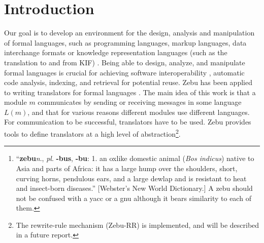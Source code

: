 \vspace*{0.5 in}



\begin{abstract}
{\sf Zebu}\footnote{``{\bf zebu}{\em n}., {\em pl}. {\bf -bus}, {\bf
-bu}: 1. an oxlike domestic animal ({\em Bos indicus}) native to Asia
and parts of Africa: it has a large hump over the shoulders, short,
curving horns, pendulous ears, and a large dewlap and is resistant to
heat and insect-born diseases.''  [Webster's New World Dictionary.]
A zebu should not be confused with a yacc or a gnu although it bears
similarity to each of them.} is part of a set of tools for the
translation of formal languages.  {\sf Zebu} contains a LALR(1) parser
generator like Yacc does.  Aside from generating a parser, {\sf Zebu}
will also generate the inverse of a parser (unparser).  In contrast to
Yacc, the semantics is not given in terms of ``routines'' but
declaratively in terms of typed feature structures.

The ability to declaratively define a reversible grammar, together with
a rewrite-rule mechanism ({\sf Zebu-RR}) for transforming abstract syntax
trees constitute the basic tools for specifying translators for formal
languages.

\paragraph{Keywords} Formal language, LALR-grammar, parsing, translation,
generation, interoperability, LEX, YACC.

\end{abstract}

\section{Introduction}
Our goal is to develop an environment for the design, analysis and
manipulation of formal languages, such as programming languages,
markup languages, data interchange formats or knowledge representation
languages (such as the translation to and from KIF) \cite{cs:kif92}.
Being able to design, analyze, and manipulate formal languages is
crucial for achieving software interoperability
\cite{cs:Genesereth92}, automatic code analysis, indexing, and
retrieval for potential reuse.  Zebu has been applied to writing
translators for formal languages \cite{ap:refine}.  The main idea of
this work is that a module $m$ communicates by sending or receiving
messages in some language $L(m)$, and that for various reasons
different modules use different languages.  For communication to be
successful, translators have to be used.  {\sf Zebu} provides tools to
define translators at a high level of abstraction\footnote{The
rewrite-rule mechanism (Zebu-RR) is implemented, and will be
described in a future report.}.


